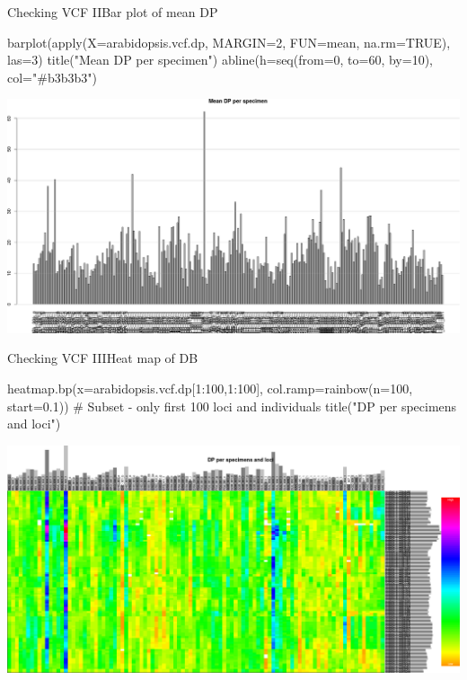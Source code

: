 \documentclass[compress, ucs, xelatex, 11pt, xcolor=svgnames,
  hyperref={
    bookmarks=true,
    unicode=true,
    colorlinks=true,
    pdftitle={Molecular data in R},
    plainpages=false,
    pdfauthor={Vojtech Zeisek},
    pdfsubject={Course about phylogeny and evolution in R},
    pdfcreator={XeLaTeX},
    pdfkeywords={R, evolution, phylogeny, molecular data},
    linkcolor=Tomato,
    anchorcolor=SaddleBrown,
    citecolor=Goldenrod,
    filecolor=DarkMagenta,
    menucolor=Sienna,
    urlcolor=DarkTurquoise,
    pdftex},
  url={hyphens, lowtilde} %
  ]{beamer}
\begin{document}
\begin{frame}[fragile]{Checking VCF II}{Bar plot of mean DP}
  \begin{spluscode}
    barplot(apply(X=arabidopsis.vcf.dp, MARGIN=2, FUN=mean, na.rm=TRUE),
      las=3)
    title("Mean DP per specimen")
    abline(h=seq(from=0, to=60, by=10), col="#b3b3b3")
  \end{spluscode}
  \begin{center}
    \includegraphics[width=\textwidth-2cm]{vcf_dp_mean.png}
  \end{center}
\end{frame}

\begin{frame}[fragile]{Checking VCF III}{Heat map of DB}
  \begin{spluscode}
    heatmap.bp(x=arabidopsis.vcf.dp[1:100,1:100], col.ramp=rainbow(n=100,
      start=0.1)) # Subset - only first 100 loci and individuals
    title("DP per specimens and loci")
  \end{spluscode}
  \begin{center}
    \includegraphics[width=\textwidth-1.25cm]{vcf_dp_heatmap.png}
  \end{center}
\end{frame}
\end{document}
